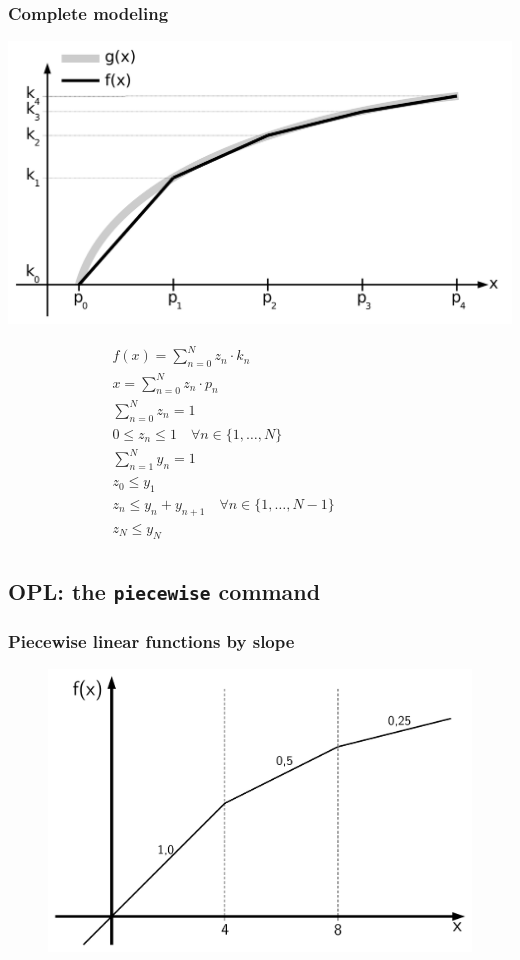 \begin{frame}
 \frametitle{Complete modeling}
 \begin{flushright}
  \includegraphics[width=.5\textwidth,page=2]{Bilder/StueckweiseLineareFunktion1}
 \end{flushright}
 \vspace{-15ex}\small
 \begin{align*}
  &f(x) = \sum_{n=0}^N z_n\cdot k_n\\
  &x = \sum_{n=0}^{N} z_n\cdot p_n\\
  &\sum_{n=0}^N z_n = 1\\
  &0 \leq z_n \leq 1\quad\forall n\in\{1, \ldots, N\}\\
  &\sum_{n=1}^{N}{y_n} = 1\\
  &z_0 \leq y_1\\
  &z_n \leq y_n + y_{n+1}\quad\forall n\in\{1, \ldots, N-1\}\qquad\qquad\qquad\mbox{}\\
  &z_N \leq y_N\\
 \end{align*}
\end{frame}

\subsection{OPL: the \texttt{piecewise} command}
\begin{frame}
 \frametitle{Piecewise linear functions by slope}
 \begin{figure}
  \centering
  \includegraphics[width=\linewidth,page=1]{Bilder/StueckweiseLineareFunktion3}
 \end{figure}
\end{frame}

